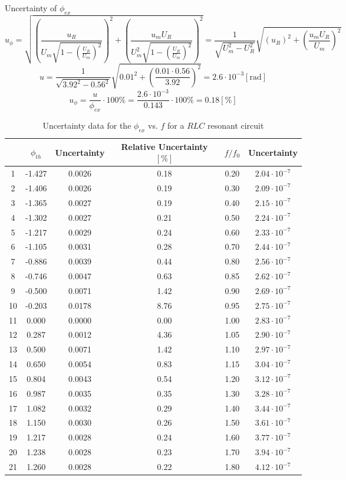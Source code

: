 \documentclass[12pt]{article}
\begin{document}
\par Uncertainty of $\phi_{ex}$
$$u_\phi=\sqrt{(\frac{u_R}{U_m\sqrt{1-(\frac{U_R}{U_m})^2}})^2+(\frac{u_mU_R}{U_m^2\sqrt{1-(\frac{U_R}{U_m})^2}})^2}=\frac{1}{\sqrt{U_m^2-U_R^2}}\sqrt{(u_R)^2+(\frac{u_mU_R}{U_m})^2}$$
$$u=\frac{1}{\sqrt{3.92^2-0.56^2}}\sqrt{0.01^2+(\frac{0.01\cdot0.56}{3.92})^2}=2.6	\cdot10^{-3}[\mathrm{rad}]$$
$$u_\phi=\frac{u}{\phi_{ex}}\cdot100\%=\frac{2.6\cdot10^{-3}}{0.143}\cdot100\%=0.18[\%]$$
\begin{table}[H]
\centering
\begin{tabular}{|c|c|c|c|c|c|}
\hline
   &$\phi_{th}$&Uncertainty&Relative Uncertainty $[\%]$&$f/f_0$&Uncertainty       \\ \hline
1  &-1.427&0.0026&0.18&0.20&$2.04\cdot10^{-7}$       \\ \hline
2  &-1.406&0.0026&0.19&0.30&$2.09\cdot10^{-7}$       \\ \hline
3  &-1.365&0.0027&0.19&0.40&$2.15\cdot10^{-7}$       \\ \hline
4  &-1.302&0.0027&0.21&0.50&$2.24\cdot10^{-7}$       \\ \hline
5  &-1.217&0.0029&0.24&0.60&$2.33\cdot10^{-7}$       \\ \hline
6  &-1.105&0.0031&0.28&0.70&$2.44\cdot10^{-7}$       \\ \hline
7  &-0.886&0.0039&0.44&0.80&$2.56\cdot10^{-7}$       \\ \hline
8  &-0.746&0.0047&0.63&0.85&$2.62\cdot10^{-7}$       \\ \hline
9  &-0.500&0.0071&1.42&0.90&$2.69\cdot10^{-7}$       \\ \hline
10 &-0.203&0.0178&8.76&0.95&$2.75\cdot10^{-7}$       \\ \hline
11 & 0.000&0.0000&0.00&1.00&$2.83\cdot10^{-7}$       \\ \hline
12 & 0.287&0.0012&4.36&1.05&$2.90\cdot10^{-7}$       \\ \hline
13 & 0.500&0.0071&1.42&1.10&$2.97\cdot10^{-7}$       \\ \hline
14 & 0.650&0.0054&0.83&1.15&$3.04\cdot10^{-7}$       \\ \hline
15 & 0.804&0.0043&0.54&1.20&$3.12\cdot10^{-7}$       \\ \hline
16 & 0.987&0.0035&0.35&1.30&$3.28\cdot10^{-7}$       \\ \hline
17 & 1.082&0.0032&0.29&1.40&$3.44\cdot10^{-7}$       \\ \hline
18 & 1.150&0.0030&0.26&1.50&$3.61\cdot10^{-7}$       \\ \hline
19 & 1.217&0.0028&0.24&1.60&$3.77\cdot10^{-7}$       \\ \hline
20 & 1.238&0.0028&0.23&1.70&$3.94\cdot10^{-7}$       \\ \hline
21 & 1.260&0.0028&0.22&1.80&$4.12\cdot10^{-7}$       \\ \hline
\end{tabular}
\caption{Uncertainty data for the $\phi_{ex}$ vs. $f$ for a $RLC$ resonant circuit}
\end{table}
\end{document}
